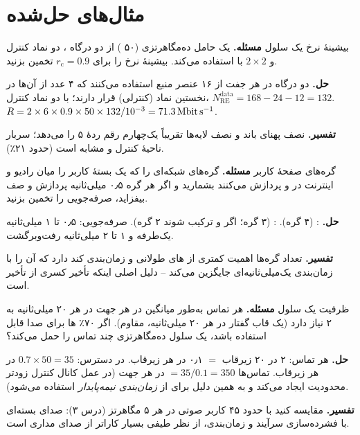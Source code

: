 \documentclass[11pt,a4paper]{article}
\begin{document}
\section{مثال‌های حل‌شده}

\begin{examplebox}{بیشینهٔ نرخ یک سلول }\label{ex:peak10}
\textbf{مسئله.} یک حامل  ده‌مگاهرتزی (۵۰ ) از دو درگاه ، دو نماد کنترل و
 $2\times2$ با  استفاده می‌کند. بیشینهٔ نرخ را برای $r_\mathrm{c} = 0.9$ تخمین بزنید.

\textbf{حل.} دو درگاه  در هر جفت  از ۱۶ عنصر منبع استفاده می‌کنند که ۴ عدد از آن‌ها در
نخستین نماد (کنترلی) قرار دارند؛ با دو نماد کنترل، $N_{\mathrm{RE}}^{\mathrm{data}} = 168 - 24 - 12 = 132$.
$R = 2\times6\times0.9\times50\times132/10^{-3} = \qty{71.3}{\mega\bit\per\second}$.

\textbf{تفسیر.} نصف پهنای باند و نصف لایه‌ها تقریباً یک‌چهارم رقم ردهٔ ۵ را می‌دهد؛ سربار ناحیهٔ کنترل و
 مشابه است (حدود ۲۱٪).
\end{examplebox}

\begin{examplebox}{گره‌های صفحهٔ کاربر}\label{ex:hops}
\textbf{مسئله.} گره‌های شبکه‌ای را که یک بستهٔ کاربر را میان رادیو و اینترنت در  و 
پردازش می‌کنند بشمارید و اگر هر گره ۰٫۵ میلی‌ثانیه پردازش و صف بیفزاید، صرفه‌جویی را تخمین بزنید.

\textbf{حل.} :  (۴ گره). :  (۳ گره؛ اگر
 و  ترکیب شوند ۲ گره). صرفه‌جویی: ۰٫۵ تا ۱ میلی‌ثانیه یک‌طرفه و ۱ تا ۲ میلی‌ثانیه رفت‌وبرگشت.

\textbf{تفسیر.} تعداد گره‌ها اهمیت کمتری از های طولانی و زمان‌بندی کند  دارد که
 آن را با زمان‌بندی یک‌میلی‌ثانیه‌ای جایگزین می‌کند -- دلیل اصلی اینکه تأخیر  کسری از
تأخیر  است.
\end{examplebox}

\begin{examplebox}{ظرفیت  یک سلول}\label{ex:volte}
\textbf{مسئله.} هر تماس  به‌طور میانگین در هر جهت در هر ۲۰ میلی‌ثانیه به ۲  نیاز دارد
(یک قاب گفتار در هر ۲۰ میلی‌ثانیه،  مقاوم). اگر ۷۰٪ ها برای صدا قابل استفاده باشد، یک
سلول ده‌مگاهرتزی چند تماس را حمل می‌کند؟

\textbf{حل.} هر تماس: ۲  در ۲۰ زیرقاب $=$ ۰٫۱  در هر زیرقاب. در دسترس: $0.7\times50 = 35$
 در هر زیرقاب. تماس‌ها $= 35/0.1 = 350$ در هر جهت (در عمل کانال کنترل  زودتر محدودیت
ایجاد می‌کند و به همین دلیل برای  از \emph{زمان‌بندی نیمه‌پایدار} استفاده می‌شود).

\textbf{تفسیر.} مقایسه کنید با حدود ۴۵ کاربر صوتی  در هر ۵ مگاهرتز (درس ۳): صدای بسته‌ای با
فشرده‌سازی سرآیند و زمان‌بندی، از نظر طیفی بسیار کاراتر از صدای مداری است.
\end{examplebox}
\end{document}
